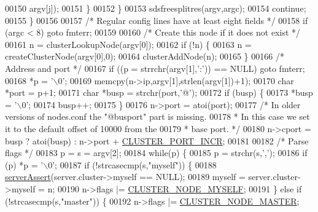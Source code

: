 \begin{DoxyCode}
{{00150                         argv[j]);
00151                 \}
00152             \}
00153             sdsfreesplitres(argv,argc);
00154             \textcolor{keywordflow}{continue};
00155         \}
00156 
00157         \textcolor{comment}{/* Regular config lines have at least eight fields */}
00158         \textcolor{keywordflow}{if} (argc < 8) \textcolor{keywordflow}{goto} fmterr;
00159 
00160         \textcolor{comment}{/* Create this node if it does not exist */}
00161         n = clusterLookupNode(argv[0]);
00162         \textcolor{keywordflow}{if} (!n) \{
00163             n = createClusterNode(argv[0],0);
00164             clusterAddNode(n);
00165         \}
00166         \textcolor{comment}{/* Address and port */}
00167         \textcolor{keywordflow}{if} ((p = strrchr(argv[1],\textcolor{stringliteral}{':'})) == NULL) \textcolor{keywordflow}{goto} fmterr;
00168         *p = \textcolor{stringliteral}{'\(\backslash\)0'};
00169         memcpy(n->ip,argv[1],strlen(argv[1])+1);
00170         \textcolor{keywordtype}{char} *port = p+1;
00171         \textcolor{keywordtype}{char} *busp = strchr(port,\textcolor{stringliteral}{'@'});
00172         \textcolor{keywordflow}{if} (busp) \{
00173             *busp = \textcolor{stringliteral}{'\(\backslash\)0'};
00174             busp++;
00175         \}
00176         n->port = atoi(port);
00177         \textcolor{comment}{/* In older versions of nodes.conf the "@busport" part is missing.}
00178 \textcolor{comment}{         * In this case we set it to the default offset of 10000 from the}
00179 \textcolor{comment}{         * base port. */}
00180         n->cport = busp ? atoi(busp) : n->port + \hyperlink{cluster_8h_ac619a9ae48ab1431daa590fb5e75cea8}{CLUSTER\_PORT\_INCR};
00181 
00182         \textcolor{comment}{/* Parse flags */}
00183         p = s = argv[2];
00184         \textcolor{keywordflow}{while}(p) \{
00185             p = strchr(s,\textcolor{stringliteral}{','});
00186             \textcolor{keywordflow}{if} (p) *p = \textcolor{stringliteral}{'\(\backslash\)0'};
00187             \textcolor{keywordflow}{if} (!strcasecmp(s,\textcolor{stringliteral}{"myself"})) \{
00188                 \hyperlink{server_8h_a88114b5169b4c382df6b56506285e56a}{serverAssert}(server.cluster->myself == NULL);
00189                 myself = server.cluster->myself = n;
00190                 n->flags |= \hyperlink{cluster_8h_afee946c4e74c08465e9b4ead5e3659e6}{CLUSTER\_NODE\_MYSELF};
00191             \} \textcolor{keywordflow}{else} \textcolor{keywordflow}{if} (!strcasecmp(s,\textcolor{stringliteral}{"master"})) \{
00192                 n->flags |= \hyperlink{cluster_8h_a5dcea846e31b55b73244aa2e496a31bf}{CLUSTER\_NODE\_MASTER};
}}
\end{DoxyCode}
